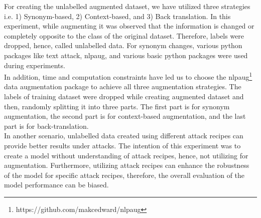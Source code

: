 \documentclass[%
	BCOR=8mm, %
	DIV=12,
	toc=bibliography, %
	toc=listof, %
	oneside, %
	egregdoesnotlikesansseriftitles, %
	]{scrbook}
\begin{document}
For creating the unlabelled augmented dataset, we have utilized three strategies i.e. 1) Synonym-based, 2) Context-based, and 3) Back translation.
In this experiment, while augmenting it was observed that the information is changed or completely opposite to the class of the original dataset. Therefore, labels were dropped, hence, called unlabelled data. 
For synonym changes, various python packages like text attack, nlpaug, and various basic python packages were used during experiments.\\
In addition, time and computation constraints have led us to choose the nlpaug\footnote{https://github.com/makcedward/nlpaug} data augmentation package  to achieve all three augmentation strategies. The labels of training dataset were dropped while creating augmented dataset and then, randomly splitting it into three parts. The first part is for synonym augmentation, the second part is for context-based augmentation, and the last part is for back-translation. \\
In another scenario, unlabelled data created using different attack recipes can provide better results under attacks. The intention of this experiment was to create a model without understanding of attack recipes, hence, not utilizing for augmentation. Furthermore, utilizing attack recipes can enhance the robustness of the model for specific attack recipes, therefore,  the overall evaluation of the model performance can be biased.
\end{document}
